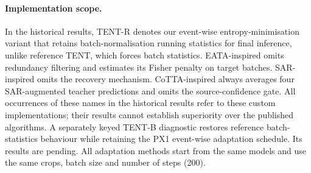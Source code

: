 \documentclass[a4paper,fleqn]{cas-sc}
\begin{document}
\paragraph{Implementation scope.} In the historical results, TENT-R denotes our event-wise entropy-minimisation variant that retains batch-normalisation running statistics for final inference, unlike reference TENT, which forces batch statistics. EATA-inspired omits redundancy filtering and estimates its Fisher penalty on target batches. SAR-inspired omits the recovery mechanism. CoTTA-inspired always averages four SAR-augmented teacher predictions and omits the source-confidence gate. All occurrences of these names in the historical results refer to these custom implementations; their results cannot establish superiority over the published algorithms. A separately keyed TENT-B diagnostic restores reference batch-statistics behaviour while retaining the PX1 event-wise adaptation schedule. Its results are pending.
All adaptation methods start from the same models and use the same crops, batch size and number of steps (200).
\end{document}
